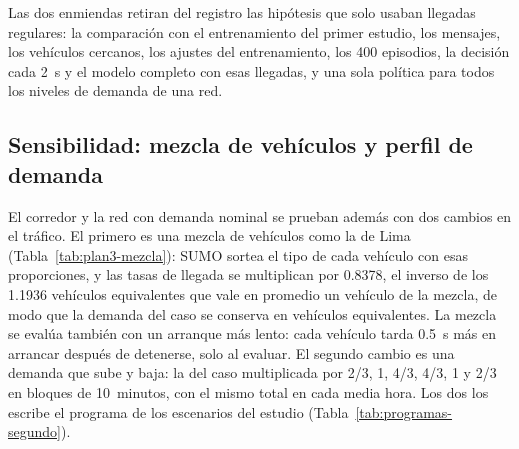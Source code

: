 Las dos enmiendas retiran del registro las hipótesis que solo usaban
llegadas regulares: la comparación con el
entrenamiento del primer estudio, los mensajes, los vehículos cercanos,
los ajustes del entrenamiento, los 400 episodios, la decisión cada 2~s
y el modelo completo con esas llegadas, y una sola política para todos
los niveles de demanda de una red.

\subsection*{Sensibilidad: mezcla de vehículos y perfil de demanda}

El corredor y la red con demanda nominal se prueban además con dos
cambios en el tráfico. El primero es una mezcla de vehículos como la de
Lima (Tabla~\ref{tab:plan3-mezcla}): SUMO sortea el tipo de cada
vehículo con esas proporciones, y las tasas de llegada se multiplican
por 0.8378, el inverso de los 1.1936 vehículos equivalentes que vale en
promedio un vehículo de la mezcla, de modo que la demanda del caso se
conserva en vehículos equivalentes. La mezcla se evalúa también con un arranque más lento:
cada vehículo tarda 0.5~s más en arrancar después de detenerse, solo al
evaluar. El segundo cambio es una demanda que sube y baja: la del caso
multiplicada por 2/3, 1, 4/3, 4/3, 1 y 2/3 en bloques de 10~minutos, con
el mismo total en cada media hora. Los dos los escribe el programa de
los escenarios del estudio (Tabla~\ref{tab:programas-segundo}).

